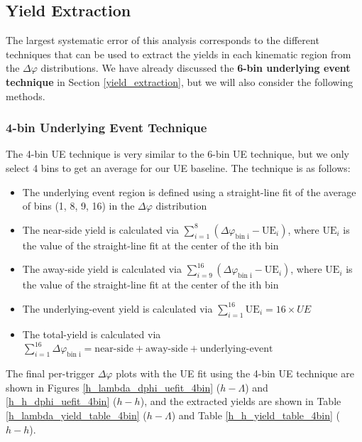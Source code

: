 \documentclass[ALICE,manyauthors]{ALICE_analysis_notes}
\begin{document}
\clearpage

\subsection{Yield Extraction}
The largest systematic error of this analysis corresponds to the different techniques that can be used to extract the yields in each kinematic region from the $\Delta\varphi$ distributions. We have already discussed the \textbf{6-bin underlying event technique} in Section \ref{yield_extraction}, but we will also consider the following methods. 

\subsubsection{4-bin Underlying Event Technique}
\label{4bin}
The 4-bin UE technique is very similar to the 6-bin UE technique, but we only select 4 bins to get an average for our UE baseline. The technique is as follows:

\begin{itemize}
\item The underlying event region is defined using a straight-line fit of the average of bins (1, 8, 9, 16) in the $\Delta\varphi$ distribution
\item The near-side yield is calculated via $\sum_{i=1}^{8} (\Delta\varphi_\text{bin i} - \text{UE}_i)$, where $\text{UE}_i$ is the value of the straight-line fit at the center of the ith bin
\item The away-side yield is calculated via $\sum_{i=9}^{16} (\Delta\varphi_\text{bin i} - \text{UE}_i)$, where $\text{UE}_i$ is the value of the straight-line fit at the center of the ith bin
\item The underlying-event yield is calculated via $\sum_{i=1}^{16} \text{UE}_i = 16 \times UE$
\item The total-yield is calculated via $\sum_{i=1}^{16} \Delta\varphi_\text{bin i} = \text{near-side} + \text{away-side} + \text{underlying-event}$
\end{itemize}

The final per-trigger $\Delta\varphi$ plots with the UE fit using the 4-bin UE technique are shown in Figures \ref{h_lambda_dphi_uefit_4bin} ($h-\Lambda$) and \ref{h_h_dphi_uefit_4bin} ($h-h$), and the extracted yields are shown in Table \ref{h_lambda_yield_table_4bin} ($h-\Lambda$) and Table \ref{h_h_yield_table_4bin} ($h-h$).
\end{document}
